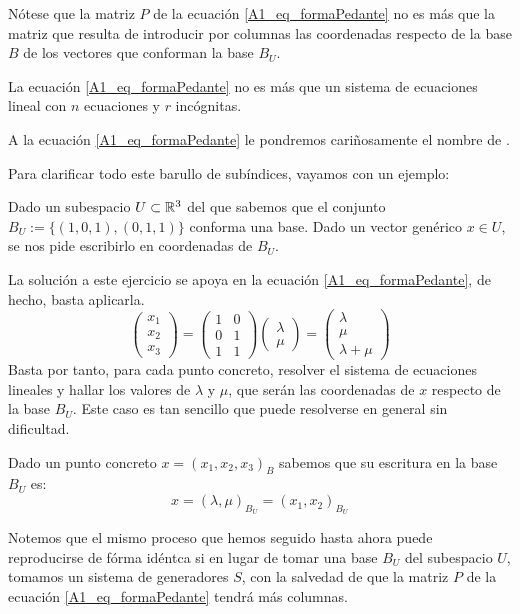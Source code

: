Nótese que la matriz $P$ de la ecuación \ref{A1_eq_formaPedante} no es más que la matriz que resulta de introducir por columnas las coordenadas respecto de la base $B$ de los vectores que conforman la base $B_U$.

La ecuación \ref{A1_eq_formaPedante} no es más que un sistema de ecuaciones lineal con $n$ ecuaciones y $r$ incógnitas.

A la ecuación \ref{A1_eq_formaPedante} le pondremos cariñosamente el nombre de .

Para clarificar todo este barullo de subíndices, vayamos con un ejemplo:
\begin{exa}
	\label{A1_exa_parametricasR3}
	Dado un subespacio $U\subset\mathbb{R}^3$ del que sabemos que el conjunto $B_{U}:=\{(1,0,1),(0,1,1)\}$ conforma una base. Dado un vector genérico $x\in U$, se nos pide escribirlo en coordenadas de $B_U$.
	
	La solución a este ejercicio se apoya en la ecuación \ref{A1_eq_formaPedante}, de hecho, basta aplicarla.
	\[\begin{pmatrix}
	x_1\\
	x_2\\
	x_3
	\end{pmatrix}=\begin{pmatrix}
	1 & 0\\
	0 & 1\\
	1 & 1
	\end{pmatrix}\begin{pmatrix}
	\lambda\\
	\mu
	\end{pmatrix}=\begin{pmatrix}
	\lambda\\
	\mu\\
	\lambda+\mu
	\end{pmatrix}\]
	Basta por tanto, para cada punto concreto, resolver el sistema de ecuaciones lineales y hallar los valores de $\lambda$ y $\mu$, que serán las coordenadas de $x$ respecto de la base $B_U$. Este caso es tan sencillo que puede resolverse en general sin dificultad.
	
	Dado un punto concreto $x=(x_1,x_2,x_3)_B$ sabemos que su escritura en la base $B_U$ es: \[x=(\lambda,\mu)_{B_U}=(x_1,x_2)_{B_U}\]
\end{exa}

Notemos que el mismo proceso que hemos seguido hasta ahora puede reproducirse de fórma idéntca si en lugar de tomar una base $B_U$ del subespacio $U$, tomamos un sistema de generadores $S$, con la salvedad de que la matriz $P$ de la ecuación \ref{A1_eq_formaPedante} tendrá más columnas.

